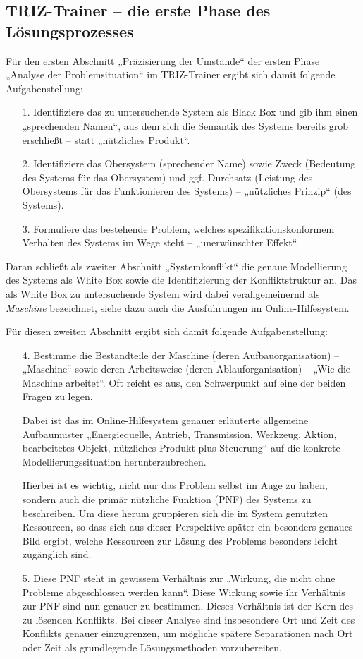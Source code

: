 \documentclass[11pt,a4paper]{article}
\begin{document}
\subsection*{TRIZ-Trainer -- die erste Phase des Lösungsprozesses}

Für den ersten Abschnitt „Präzisierung der Umstände“ der ersten Phase „Analyse
der Problemsituation“ im TRIZ-Trainer ergibt sich damit folgende
Aufgabenstellung:
\begin{itemize}
\item [1.] Identifiziere das zu untersuchende System als Black Box und gib ihm
  einen „sprechenden Namen“, aus dem sich die Semantik des Systems bereits
  grob erschließt -- statt „nützliches Produkt“. 
\item [2.] Identifiziere das Obersystem (sprechender Name) sowie Zweck
  (Bedeutung des Systems für das Obersystem) und ggf. Durchsatz (Leistung des
  Obersystems für das Funktionieren des Systems) -- „nützliches Prinzip“ (des
  Systems). 
\item [3.] Formuliere das bestehende Problem, welches spezifikationskonformem
  Verhalten des Systems im Wege steht -- „unerwünschter Effekt“.
\end{itemize}
Daran schließt als zweiter Abschnitt „Systemkonflikt“ die genaue Modellierung
des Systems als White Box sowie die Identifizierung der Konfliktstruktur an.
Das als White Box zu untersuchende System wird dabei verallgemeinernd als
\emph{Maschine} bezeichnet, siehe dazu auch die Ausführungen im
Online-Hilfesystem.

Für diesen zweiten Abschnitt ergibt sich damit folgende Aufgabenstellung:
\begin{itemize}
\item [4.] Bestimme die Bestandteile der Maschine (deren Aufbauorganisation)
  -- „Maschine“ sowie deren Arbeitsweise (deren Ablauforganisation) -- „Wie
  die Maschine arbeitet“. Oft reicht es aus, den Schwerpunkt auf eine der
  beiden Fragen zu legen.

  Dabei ist das im Online-Hilfesystem genauer erläuterte allgemeine
  Aufbaumuster „Energiequelle, Antrieb, Transmission, Werkzeug, Aktion,
  bearbeitetes Objekt, nützliches Produkt plus Steuerung“ auf die konkrete
  Modellierungssituation herunterzubrechen.
  
  Hierbei ist es wichtig, nicht nur das Problem selbst im Auge zu haben,
  sondern auch die primär nützliche Funktion (PNF) des Systems zu beschreiben.
  Um diese herum gruppieren sich die im System genutzten Ressourcen, so dass
  sich aus dieser Perspektive später ein besonders genaues Bild ergibt, welche
  Ressourcen zur Lösung des Problems besonders leicht zugänglich sind. 

\item [5.] Diese PNF steht in gewissem Verhältnis zur „Wirkung, die nicht ohne
  Probleme abgeschlossen werden kann“. Diese Wirkung sowie ihr Verhältnis zur
  PNF sind nun genauer zu bestimmen. Dieses Verhältnis ist der Kern des zu
  lösenden Konflikts.  Bei dieser Analyse sind insbesondere Ort und Zeit des
  Konflikts genauer einzugrenzen, um mögliche spätere Separationen nach Ort
  oder Zeit als grundlegende Lösungsmethoden vorzubereiten. 
\end{itemize}
\end{document}
